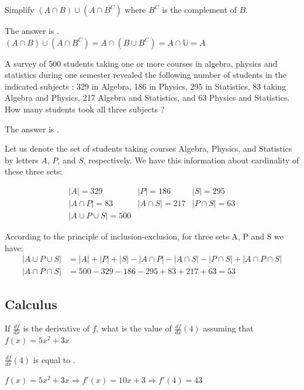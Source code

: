 \documentclass{ximera}
\begin{document}
\begin{question}
Simplify $(A \cap B) \cup (A \cap B^C)$ where $B^C$ is the complement of $B$.
\begin{solution}
The answer is . \\
$(A \cap B) \cup (A \cap B^C) = A \cap (B \cup B^C) = A \cap \mathbb{U} = A$
\end{solution}
\end{question}

\begin{question}
A survey of 500 students taking one or more courses in algebra, physics and statistics during one semester revealed
the following number of students in the indicated subjects : 
329 in Algebra, 186 in Physics, 295 in Statistics, 83 taking Algebra and Physics, 217 Algebra and Statistics, and 63 Physics and Statistics.
How many students took all three subjects ? 
\begin{solution}
The answer is . 
\end{solution}

Let us denote the set of students taking courses Algebra, Physics, and Statistics by letters $A$, $P$, and $S$, respectively. We have this information about cardinality of these three sets:

\begin{equation*}
	\begin{array}{lll}
	 |A| = 329							& |P| = 186				& |S| = 295 \\
	 |A \cap P| = 83				& |A \cap S| = 217	& |P \cap S| = 63 \\
	 |A \cup P \cup S| = 500	& &
	\end{array}
\end{equation*}

According to the principle of inclusion-exclusion, for three sets A, P and S we have:
\begin{align*}
|A \cup P \cup S| &= |A| + |P| + |S| - |A \cap P| - |A \cap S| - |P \cap S| + |A \cap P \cap S|\\
|A \cap P \cap S| &= 500 - 329 - 186 - 295 + 83 + 217 + 63 = 53
\end{align*}
\end{question}

\subsection*{Calculus}

\begin{question}
If $\frac{df}{dx}$ is the derivative of $f$, what is the value of $\frac{df}{dx}(4)$ assuming that 
$f(x) = 5x^2 +3x$ 

\begin{solution}
$\frac{df}{dx}(4)$ is equal to .
\end{solution}

$f(x) = 5x^2 + 3x \Rightarrow f'(x) = 10 x + 3 \Rightarrow f'(4) = 43$
\end{question}
\end{document}
